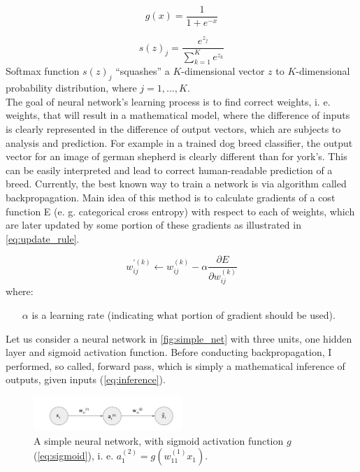 \documentclass[11pt]{article}
\begin{document}
\begin{equation} \label{eq:sigmoid}
g(x) = \frac{1}{1 + e^{-x}}
\end{equation}

\begin{equation} \label{eq:softmax}
s(z)_j = \frac{e^{z_j}}{\sum_{k=1}^Ke^{z_k}}
\end{equation}
Softmax function $s(z)_j$ “squashes” a $K$-dimensional vector $z$ to $K$-dimensional probability distribution, where $j=1, ..., K$.\\

The goal of neural network's learning process is to find correct weights, i. e. weights, that will result in a mathematical model, where the difference of inputs is clearly represented in the difference of output vectors, which are subjects to analysis and prediction. For example in a trained dog breed classifier, the output vector for an image of german shepherd is clearly different than for york's. This can be easily interpreted and lead to correct human-readable prediction of a breed. Currently, the best known way to train a network is via algorithm called backpropagation. Main idea of this method is to calculate gradients of a cost function E (e. g. categorical cross entropy) with respect to each of weights, which are later updated by some portion of these gradients as illustrated in \autoref{eq:update_rule}.

\begin{equation} \label{eq:update_rule}
w_{ij}^{'(k)} \leftarrow w_{ij}^{(k)} - \alpha\frac{\partial E}{\partial w_{ij}^{(k)}}
\end{equation}
where:
\begin{itemize}
\item[$\alpha$] is a learning rate (indicating what portion of gradient should be used).
\end{itemize}

Let us consider a neural network in \autoref{fig:simple_net} with three units, one hidden layer and sigmoid activation function. Before conducting backpropagation, I performed, so called, forward pass, which is simply a mathematical inference of outputs, given inputs (\autoref{eq:inference}).\\

\begin{figure}[h]
\includegraphics[width=0.5\textwidth]{simple_net}
\centering
\caption{A simple neural network, with sigmoid activation function $g$ (\autoref{eq:sigmoid}), i. e. $a_1^{(2)}=g(w_{11}^{(1)}x_1)$.}
\label{fig:simple_net}
\end{figure}
\end{document}
